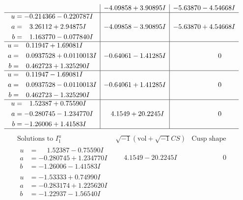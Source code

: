 \documentclass[1p]{elsarticle_modified}
\theoremstyle{definition}
\newcommand{\I}{\sqrt{-1}}
\begin{document}
$$\begin{array}{c|c|c}
 & -4.09858 + 3.90895 I & -5.63870 - 4.54668 I \\ \hline\begin{aligned}
u &= -0.214366 - 0.220787 I \\
a &= \phantom{-}3.26112 + 2.94875 I \\
b &= \phantom{-}1.163770 - 0.077840 I\end{aligned}
 & -4.09858 - 3.90895 I & -5.63870 + 4.54668 I \\ \hline\begin{aligned}
u &= \phantom{-}0.11947 + 1.69081 I \\
a &= \phantom{-}0.0937528 + 0.0110013 I \\
b &= \phantom{-}0.462723 + 1.325290 I\end{aligned}
 & -0.64061 - 1.41285 I & \phantom{-0.000000 } 0 \\ \hline\begin{aligned}
u &= \phantom{-}0.11947 - 1.69081 I \\
a &= \phantom{-}0.0937528 - 0.0110013 I \\
b &= \phantom{-}0.462723 - 1.325290 I\end{aligned}
 & -0.64061 + 1.41285 I & \phantom{-0.000000 } 0 \\ \hline\begin{aligned}
u &= \phantom{-}1.52387 + 0.75590 I \\
a &= -0.280745 - 1.234770 I \\
b &= -1.26006 + 1.41583 I\end{aligned}
 & \phantom{-}4.1549 + 20.2245 I & \phantom{-0.000000 } 0\\
 \hline 
 \end{array}$$\newpage$$\begin{array}{c|c|c}  
\text{Solutions to }I^u_{1}& \I (\text{vol} + \sqrt{-1}CS) & \text{Cusp shape}\\
 \hline 
\begin{aligned}
u &= \phantom{-}1.52387 - 0.75590 I \\
a &= -0.280745 + 1.234770 I \\
b &= -1.26006 - 1.41583 I\end{aligned}
 & \phantom{-}4.1549 - 20.2245 I & \phantom{-0.000000 } 0 \\ \hline\begin{aligned}
u &= -1.53333 + 0.74990 I \\
a &= -0.283174 + 1.225620 I \\
b &= -1.22937 - 1.56540 I\end{aligned}

\end{array}$$
\end{document}
